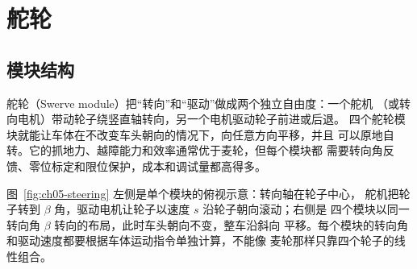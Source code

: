 \section{舵轮}

\subsection{模块结构}

舵轮（Swerve module）把“转向”和“驱动”做成两个独立自由度：一个舵机
（或转向电机）带动轮子绕竖直轴转向，另一个电机驱动轮子前进或后退。
四个舵轮模块就能让车体在不改变车头朝向的情况下，向任意方向平移，并且
可以原地自转。它的抓地力、越障能力和效率通常优于麦轮，但每个模块都
需要转向角反馈、零位标定和限位保护，成本和调试量都高得多。

图~\ref{fig:ch05-steering} 左侧是单个模块的俯视示意：转向轴在轮子中心，
舵机把轮子转到 $\beta$ 角，驱动电机让轮子以速度 $s$ 沿轮子朝向滚动；右侧是
四个模块以同一转向角 $\beta$ 转向的布局，此时车头朝向不变，整车沿斜向
平移。每个模块的转向角和驱动速度都要根据车体运动指令单独计算，不能像
麦轮那样只靠四个轮子的线性组合。

